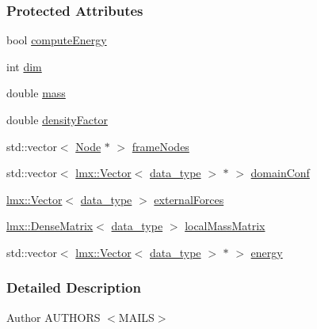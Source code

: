 \subsubsection*{Protected Attributes}
\begin{DoxyCompactItemize}
\item 
bool \hyperlink{classmknix_1_1_rigid_body_a569b96d28e2b0c008240a001c3a87eb3}{compute\+Energy}
\item 
int \hyperlink{classmknix_1_1_rigid_body_abdb2cd12b0d4c08b6ba7a7c3fd84b2e2}{dim}
\item 
double \hyperlink{classmknix_1_1_rigid_body_af9643b668fbafd10ffd392b8aebdae5e}{mass}
\item 
double \hyperlink{classmknix_1_1_rigid_body_ab863575aa5443846e4e07ff2ce058703}{density\+Factor}
\item 
std\+::vector$<$ \hyperlink{classmknix_1_1_node}{Node} $\ast$ $>$ \hyperlink{classmknix_1_1_rigid_body_a8ecbeb686c302e33e0885db701f0b8f9}{frame\+Nodes}
\item 
std\+::vector$<$ \hyperlink{classlmx_1_1_vector}{lmx\+::\+Vector}$<$ \hyperlink{namespacemknix_a16be4b246fbf2cceb141e3a179111020}{data\+\_\+type} $>$ $\ast$ $>$ \hyperlink{classmknix_1_1_rigid_body_a723cff9101bc55839f7147af9bb1eca3}{domain\+Conf}
\item 
\hyperlink{classlmx_1_1_vector}{lmx\+::\+Vector}$<$ \hyperlink{namespacemknix_a16be4b246fbf2cceb141e3a179111020}{data\+\_\+type} $>$ \hyperlink{classmknix_1_1_rigid_body_ab465103ed21d529c66733705ad5b588c}{external\+Forces}
\item 
\hyperlink{classlmx_1_1_dense_matrix}{lmx\+::\+Dense\+Matrix}$<$ \hyperlink{namespacemknix_a16be4b246fbf2cceb141e3a179111020}{data\+\_\+type} $>$ \hyperlink{classmknix_1_1_rigid_body_ae9b2edfc311425d483edaaf7100d6ab7}{local\+Mass\+Matrix}
\item 
std\+::vector$<$ \hyperlink{classlmx_1_1_vector}{lmx\+::\+Vector}$<$ \hyperlink{namespacemknix_a16be4b246fbf2cceb141e3a179111020}{data\+\_\+type} $>$ $\ast$ $>$ \hyperlink{classmknix_1_1_rigid_body_a372052707d7e00a97db50ce6d323cdf3}{energy}
\end{DoxyCompactItemize}


\subsubsection{Detailed Description}
\begin{DoxyAuthor}{Author}
A\+U\+T\+H\+O\+R\+S $<$\+M\+A\+I\+L\+S$>$ 
\end{DoxyAuthor}


